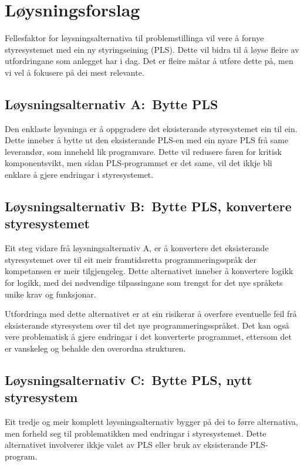 \newpage
\section{Løysningsforslag}

Fellesfaktor for løysningsalternativa til problemstillinga vil vere å fornye
styresystemet med ein ny styringseining (\gls{PLS}). 
Dette vil bidra til å løyse fleire av utfordringane som anlegget har i dag.\newline
Det er fleire måtar å utføre dette på, men vi vel å fokusere på dei mest relevante.

\subsection{Løysningsalternativ A:~Bytte \gls{PLS}}
Den enklaste løysninga er å oppgradere det eksisterande styresystemet ein til ein. 
Dette inneber å bytte ut den eksisterande \gls{PLS}-en med ein nyare \gls{PLS} frå same leverandør, som inneheld lik programvare.\newline
Dette vil redusere faren for kritisk komponentsvikt, men sidan \gls{PLS}-programmet er det same, 
vil det ikkje bli enklare å gjere endringar i styresystemet.

\subsection{Løysningsalternativ B:~Bytte \gls{PLS}, konvertere styresystemet}
Eit steg vidare frå løysningsalternativ A, er å konvertere det eksisterande styresystemet over til eit meir
framtidsretta programmeringsspråk der kompetansen er meir tilgjengeleg. Dette alternativet inneber å konvertere logikk for logikk,
med dei nødvendige tilpassingane som trengst for det nye språkets unike krav og funksjonar.

Utfordringa med dette alternativet er at ein risikerar å overføre eventuelle feil frå eksisterande
styresystem over til det nye programmeringsspråket. Det kan også vere problematisk å gjere endringar
i det konverterte programmet, ettersom det er vanskeleg og behalde den overordna strukturen.

\subsection{Løysningsalternativ C:~Bytte \gls{PLS}, nytt styresystem}
Eit tredje og meir komplett løysningsalternativ bygger på dei to førre alternativa, 
men forheld seg til problematikken med endringar i styresystemet.
Dette alternativet involverer ikkje valet av \gls{PLS} eller bruk av eksisterande \gls{PLS}-program.

